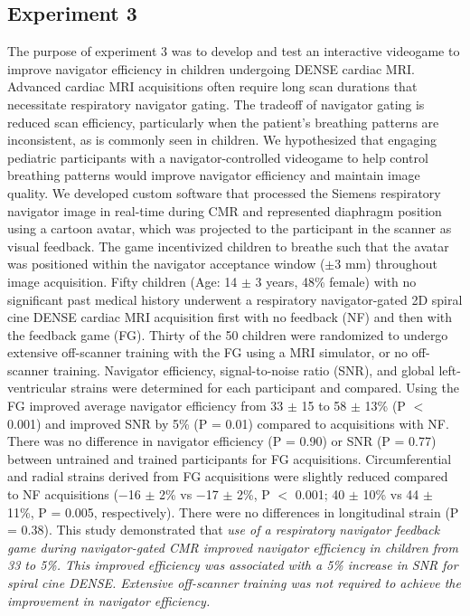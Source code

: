\subsection{Experiment 3}
	The purpose of experiment 3 was to develop and test an interactive videogame to improve navigator efficiency in children undergoing DENSE cardiac MRI. Advanced cardiac MRI acquisitions often require long scan durations that necessitate respiratory navigator gating. The tradeoff of navigator gating is reduced scan efficiency, particularly when the patient's breathing patterns are inconsistent, as is commonly seen in children. We hypothesized that engaging pediatric participants with a navigator-controlled videogame to help control breathing patterns would improve navigator efficiency and maintain image quality. We developed custom software that processed the Siemens respiratory navigator image in real-time during CMR and represented diaphragm position using a cartoon avatar, which was projected to the participant in the scanner as visual feedback. The game incentivized children to breathe such that the avatar was positioned within the navigator acceptance window ($\pm$3 mm) throughout image acquisition. Fifty children (Age: 14 $\pm$ 3 years, 48\% female) with no significant past medical history underwent a respiratory navigator-gated 2D spiral cine DENSE cardiac MRI acquisition first with no feedback (NF) and then with the feedback game (FG). Thirty of the 50 children were randomized to undergo extensive off-scanner training with the FG using a MRI simulator, or no off-scanner training. Navigator efficiency, signal-to-noise ratio (SNR), and global left-ventricular strains were determined for each participant and compared. Using the FG improved average navigator efficiency from 33 $\pm$ 15 to 58 $\pm$ 13\% (P $<$ 0.001) and improved SNR by 5\% (P = 0.01) compared to acquisitions with NF. There was no difference in navigator efficiency (P = 0.90) or SNR (P = 0.77) between untrained and trained participants for FG acquisitions. Circumferential and radial strains derived from FG acquisitions were slightly reduced compared to NF acquisitions (−16 $\pm$ 2\% vs −17 $\pm$ 2\%, P $<$ 0.001; 40 $\pm$ 10\% vs 44 $\pm$ 11\%, P = 0.005, respectively). There were no differences in longitudinal strain (P = 0.38). This study demonstrated that \textit{use of a respiratory navigator feedback game during navigator-gated CMR improved navigator efficiency in children from 33 to 5\%. This improved efficiency was associated with a 5\% increase in SNR for spiral cine DENSE. Extensive off-scanner training was not required to achieve the improvement in navigator efficiency.}
	
